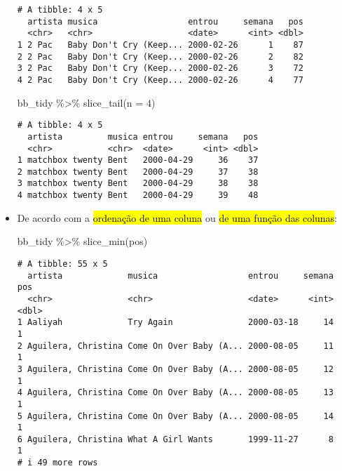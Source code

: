 \documentclass[
  letterpaper,
  DIV=11,
  numbers=noendperiod]{scrreprt}
\newenvironment{Shaded}{\begin{snugshade}}{\end{snugshade}}
\newcommand{\AttributeTok}[1]{\textcolor[rgb]{0.40,0.45,0.13}{#1}}
\newcommand{\DecValTok}[1]{\textcolor[rgb]{0.68,0.00,0.00}{#1}}
\newcommand{\FunctionTok}[1]{\textcolor[rgb]{0.28,0.35,0.67}{#1}}
\newcommand{\NormalTok}[1]{\textcolor[rgb]{0.00,0.23,0.31}{#1}}
\newcommand{\SpecialCharTok}[1]{\textcolor[rgb]{0.37,0.37,0.37}{#1}}
\begin{document}
\begin{itemize}
\begin{verbatim}
# A tibble: 4 x 5
  artista musica                  entrou     semana   pos
  <chr>   <chr>                   <date>      <int> <dbl>
1 2 Pac   Baby Don't Cry (Keep... 2000-02-26      1    87
2 2 Pac   Baby Don't Cry (Keep... 2000-02-26      2    82
3 2 Pac   Baby Don't Cry (Keep... 2000-02-26      3    72
4 2 Pac   Baby Don't Cry (Keep... 2000-02-26      4    77
\end{verbatim}

\begin{Shaded}
\begin{Highlighting}[]
\NormalTok{bb\_tidy }\SpecialCharTok{\%\textgreater{}\%} 
  \FunctionTok{slice\_tail}\NormalTok{(}\AttributeTok{n =} \DecValTok{4}\NormalTok{)}
\end{Highlighting}
\end{Shaded}

\begin{verbatim}
# A tibble: 4 x 5
  artista         musica entrou     semana   pos
  <chr>           <chr>  <date>      <int> <dbl>
1 matchbox twenty Bent   2000-04-29     36    37
2 matchbox twenty Bent   2000-04-29     37    38
3 matchbox twenty Bent   2000-04-29     38    38
4 matchbox twenty Bent   2000-04-29     39    48
\end{verbatim}
\item
  De acordo com a {\hl{ordenação de uma coluna}} ou {\hl{de uma função
  das colunas}}:

\begin{Shaded}
\begin{Highlighting}[]
\NormalTok{bb\_tidy }\SpecialCharTok{\%\textgreater{}\%} 
  \FunctionTok{slice\_min}\NormalTok{(pos)}
\end{Highlighting}
\end{Shaded}

\begin{verbatim}
# A tibble: 55 x 5
  artista             musica                  entrou     semana   pos
  <chr>               <chr>                   <date>      <int> <dbl>
1 Aaliyah             Try Again               2000-03-18     14     1
2 Aguilera, Christina Come On Over Baby (A... 2000-08-05     11     1
3 Aguilera, Christina Come On Over Baby (A... 2000-08-05     12     1
4 Aguilera, Christina Come On Over Baby (A... 2000-08-05     13     1
5 Aguilera, Christina Come On Over Baby (A... 2000-08-05     14     1
6 Aguilera, Christina What A Girl Wants       1999-11-27      8     1
# i 49 more rows
\end{verbatim}


\end{itemize}
\end{document}
